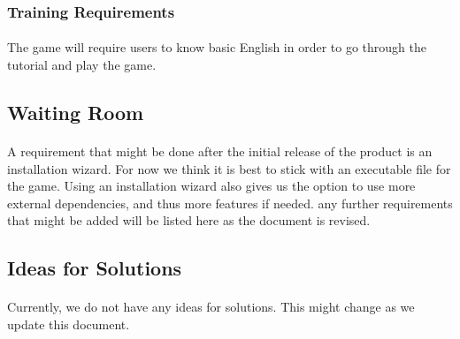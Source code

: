 \documentclass[12pt, titlepage]{article}
\begin{document}
\subsubsection{Training Requirements}
\paragraph{}The game will require users to know basic English in order to go through the tutorial and play the game.
\subsection{Waiting Room}
\paragraph{}A requirement that might be done after the initial release of the product is an installation wizard. For now we think it is best to stick with an executable file for the game. Using an installation wizard also gives us the option to use more external dependencies, and thus more features if needed. any further requirements that might be added will be listed here as the document is revised.
\subsection{Ideas for Solutions}
\paragraph{}Currently, we do not have any ideas for solutions. This might change as we update this document.


\end{document}
